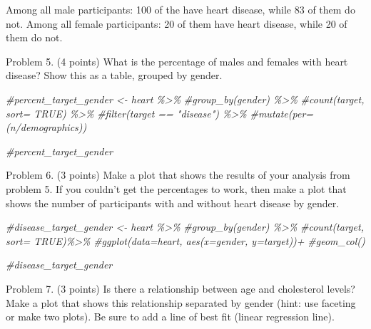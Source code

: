 \documentclass[
]{article}
\newenvironment{Shaded}{\begin{snugshade}}{\end{snugshade}}
\newcommand{\CommentTok}[1]{\textcolor[rgb]{0.56,0.35,0.01}{\textit{#1}}}
\begin{document}
Among all male participants: 100 of the have heart disease, while 83 of
them do not. Among all female participants: 20 of them have heart
disease, while 20 of them do not.

Problem 5. (4 points) What is the percentage of males and females with
heart disease? Show this as a table, grouped by gender.

\begin{Shaded}
\begin{Highlighting}[]
\CommentTok{\#percent\_target\_gender \textless{}{-} heart \%\textgreater{}\%}
  \CommentTok{\#group\_by(gender) \%\textgreater{}\%}
  \CommentTok{\#count(target, sort= TRUE) \%\textgreater{}\%}
  \CommentTok{\#filter(target == "disease") \%\textgreater{}\%}
  \CommentTok{\#mutate(per=(n/demographics))}

\CommentTok{\#percent\_target\_gender}
\end{Highlighting}
\end{Shaded}

Problem 6. (3 points) Make a plot that shows the results of your
analysis from problem 5. If you couldn't get the percentages to work,
then make a plot that shows the number of participants with and without
heart disease by gender.

\begin{Shaded}
\begin{Highlighting}[]
\CommentTok{\#disease\_target\_gender \textless{}{-} heart \%\textgreater{}\%}
  \CommentTok{\#group\_by(gender) \%\textgreater{}\%}
  \CommentTok{\#count(target, sort= TRUE)\%\textgreater{}\%}
  \CommentTok{\#ggplot(data=heart, aes(x=gender, y=target))+}
  \CommentTok{\#geom\_col()}

\CommentTok{\#disease\_target\_gender}
\end{Highlighting}
\end{Shaded}

Problem 7. (3 points) Is there a relationship between age and
cholesterol levels? Make a plot that shows this relationship separated
by gender (hint: use faceting or make two plots). Be sure to add a line
of best fit (linear regression line).
\end{document}
